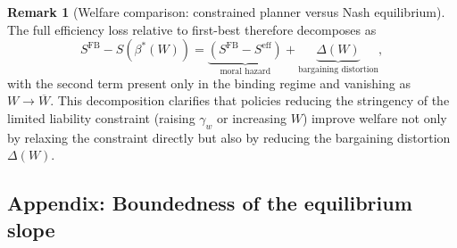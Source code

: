 \documentclass{article}
\theoremstyle{definition}
\newtheorem{remark}{Remark}[section]
\theoremstyle{plain}
\begin{document}
\begin{remark}[Welfare comparison: constrained planner versus Nash equilibrium]
The full efficiency loss relative to first-best therefore decomposes as
\[
S^{\mathrm{FB}} - S(\beta^*(W)) = \underbrace{(S^{\mathrm{FB}} - S^{\mathrm{eff}})}_{\text{moral hazard}} + \underbrace{\Delta(W)}_{\text{bargaining distortion}},
\]
with the second term present only in the binding regime and vanishing as $W \to \overline{W}$. This decomposition clarifies that policies reducing the stringency of the limited liability constraint (raising $\gamma_w$ or increasing $W$) improve welfare not only by relaxing the constraint directly but also by reducing the bargaining distortion $\Delta(W)$.
\end{remark}

\begin{appendices}
\section{Appendix: Boundedness of the equilibrium slope}\label{app:beta_bounds}


\end{appendices}
\end{document}
